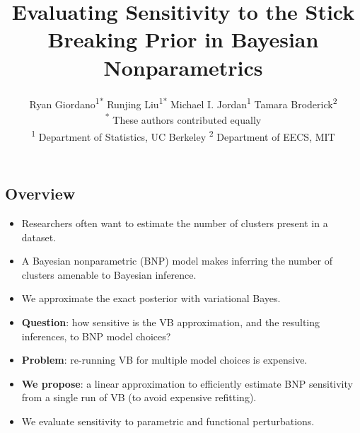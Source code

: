 \documentclass[a0,plainsections,30pt]{sciposter}\usepackage[]{graphicx}\usepackage[]{color}
\title{\textcolor{mydarkblue}{Evaluating Sensitivity to the Stick Breaking Prior in Bayesian Nonparametrics
}}
\author{Ryan Giordano\textsuperscript{1*} \quad
Runjing Liu\textsuperscript{1*} \quad
Michael I. Jordan\textsuperscript{1} \quad
Tamara Broderick\textsuperscript{2} \\
{\large\normalfont\textsuperscript{*} These authors contributed equally}\\
 {\large\normalfont\textsuperscript{1} Department of Statistics, UC Berkeley \quad \textsuperscript{2} Department of EECS, MIT}
 }
\begin{document}


\setlength{\parskip}{0.25em}

\maketitle

\vspace{-1in}






\begin{minipage}[t]{0.45\textwidth}

\begin{mdframed}[style=MyFrame]
\section*{Overview}
\vspace{-0.3in}
\begin{itemize}
\item Researchers often want to estimate the number of clusters present in a dataset.

\item A Bayesian nonparametric (BNP) model makes inferring the number of clusters amenable to Bayesian inference.

\item We approximate the exact posterior with variational Bayes.

\item \textbf{Question}: how sensitive is the
VB approximation, and the resulting inferences, to BNP model choices?

\item \textbf{Problem}: re-running VB for multiple model choices is expensive.

\item \textbf{We propose}: a linear approximation to efficiently
estimate BNP sensitivity from a single run of VB (to avoid
expensive refitting).

\item We evaluate sensitivity to parametric and functional perturbations.

\end{itemize}
\end{mdframed}
\vspace{-0.7in}


\end{minipage}
\end{document}
